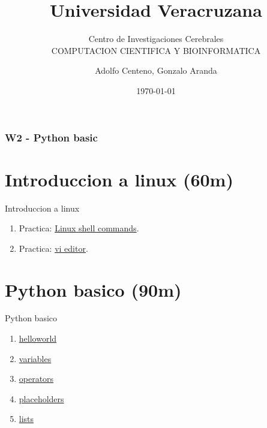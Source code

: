 \documentclass{beamer}
\begin{document}
\title{Universidad Veracruzana}  
\subtitle{Centro de Investigaciones Cerebrales\\COMPUTACION CIENTIFICA Y BIOINFORMATICA}
\author{Adolfo Centeno, Gonzalo Aranda}
\date{\today} 

\begin{frame}
\titlepage
\end{frame}

\begin{frame}\frametitle{W2 - Python basic}
\tableofcontents
\end{frame} 






\section{Introduccion a linux (60m) }

\begin{frame}


Introduccion a linux

\begin{enumerate}
\item
	 
	Practica: \href{https://github.com/adsoftsito/python/blob/master/w2/linuxcommands.pdf}{Linux shell commands}.
	
    
\item
	Practica: \href{https://github.com/adsoftsito/python/blob/master/w2/vi-editor.pdf}{vi editor}.

\end{enumerate} 


\end{frame}


\section{Python basico (90m) }

\begin{frame}


Python basico

\begin{enumerate}
\item
	 \href{https://github.com/adsoftsito/python/blob/master/w2/helloworld.py}{helloworld}
\item
	\href{https://github.com/adsoftsito/python/blob/master/w2/variables.py}{variables}
\item
	\href{https://github.com/adsoftsito/python/blob/master/w2/operators.py}{operators}
\item
	\href{https://github.com/adsoftsito/python/blob/master/w2/placeholders.py}{placeholders}
\item
	\href{https://github.com/adsoftsito/python/blob/master/w2/lists.py}{lists}
	
\end{enumerate} 


\end{frame}
\end{document}
